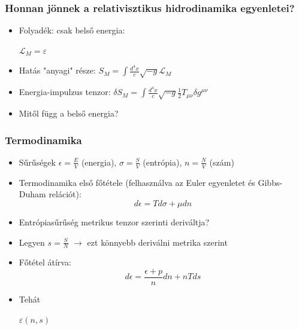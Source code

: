 \documentclass{beamer}
\begin{document}
\begin{frame}
\frametitle{Honnan jönnek a relativisztikus hidrodinamika egyenletei?}

\begin{itemize}
  \setlength{\itemsep}{20pt}

\item Folyadék: csak belső energia: \begin{large}$\mathcal{L}_M=\varepsilon$\end{large}
\item Hatás "anyagi" része: $S_M= \int \frac{d^4x}{c}\sqrt{-g}\mathcal{L}_M$
\item Energia-impulzus tenzor: $\delta S_M=\int \frac{d^4x}{c}\sqrt{-g}\frac{1}{2}T_{\mu\nu}\delta g^{\mu\nu}$
\item Mitől függ a belső energia? 
\end{itemize}

\end{frame}



\begin{frame}
\frametitle{Termodinamika}
\begin{itemize}
  \setlength{\itemsep}{16pt}

\item Sűrűségek $\epsilon=\frac{E}{V}$ (energia), $\sigma = \frac{S}{V}$ (entrópia), $n=\frac{N}{V}$ (szám)
\item Termodinamika első főtétele (felhasználva az Euler egyenletet és Gibbs-Duham relációt):
\begin{equation*}
d\epsilon=Td\sigma +\mu dn
\end{equation*} 

\item Entrópiasűrűség metrikus tenzor szerinti deriváltja?

\item Legyen $s=\frac{S}{N}$ $\rightarrow$ ezt könnyebb deriválni metrika szerint

\item Főtétel átírva:
\begin{equation*}
d\epsilon=\frac{\epsilon+p}{n}dn+nTds
\end{equation*}

\item Tehát \begin{large}$\varepsilon(n,s)$\end{large}
\end{itemize}

\end{frame}
\end{document}
